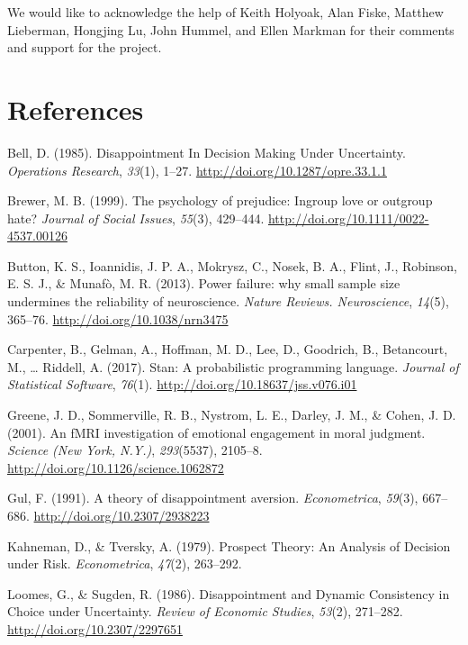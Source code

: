 \documentclass[10pt, letterpaper]{article}
\begin{document}
We would like to acknowledge the help of Keith Holyoak, Alan Fiske,
Matthew Lieberman, Hongjing Lu, John Hummel, and Ellen Markman for their
comments and support for the project.

\section{References}\label{references}

\setlength{\parindent}{-0.1in} \setlength{\leftskip}{0.125in} \noindent

\hypertarget{refs}{}
\hypertarget{ref-Bell1985}{}
Bell, D. (1985). Disappointment In Decision Making Under Uncertainty.
\emph{Operations Research}, \emph{33}(1), 1--27.
\url{http://doi.org/10.1287/opre.33.1.1}

\hypertarget{ref-Brewer1999}{}
Brewer, M. B. (1999). The psychology of prejudice: Ingroup love or
outgroup hate? \emph{Journal of Social Issues}, \emph{55}(3), 429--444.
\url{http://doi.org/10.1111/0022-4537.00126}

\hypertarget{ref-Button2013}{}
Button, K. S., Ioannidis, J. P. A., Mokrysz, C., Nosek, B. A., Flint,
J., Robinson, E. S. J., \& Munafò, M. R. (2013). Power failure: why
small sample size undermines the reliability of neuroscience.
\emph{Nature Reviews. Neuroscience}, \emph{14}(5), 365--76.
\url{http://doi.org/10.1038/nrn3475}

\hypertarget{ref-Carpenter2017}{}
Carpenter, B., Gelman, A., Hoffman, M. D., Lee, D., Goodrich, B.,
Betancourt, M., \ldots{} Riddell, A. (2017). Stan: A probabilistic
programming language. \emph{Journal of Statistical Software},
\emph{76}(1). \url{http://doi.org/10.18637/jss.v076.i01}

\hypertarget{ref-Greene2001}{}
Greene, J. D., Sommerville, R. B., Nystrom, L. E., Darley, J. M., \&
Cohen, J. D. (2001). An fMRI investigation of emotional engagement in
moral judgment. \emph{Science (New York, N.Y.)}, \emph{293}(5537),
2105--8. \url{http://doi.org/10.1126/science.1062872}

\hypertarget{ref-Gul1991}{}
Gul, F. (1991). A theory of disappointment aversion.
\emph{Econometrica}, \emph{59}(3), 667--686.
\url{http://doi.org/10.2307/2938223}

\hypertarget{ref-Kahneman1979}{}
Kahneman, D., \& Tversky, A. (1979). Prospect Theory: An Analysis of
Decision under Risk. \emph{Econometrica}, \emph{47}(2), 263--292.

\hypertarget{ref-Loomes1986}{}
Loomes, G., \& Sugden, R. (1986). Disappointment and Dynamic Consistency
in Choice under Uncertainty. \emph{Review of Economic Studies},
\emph{53}(2), 271--282. \url{http://doi.org/10.2307/2297651}
\end{document}
